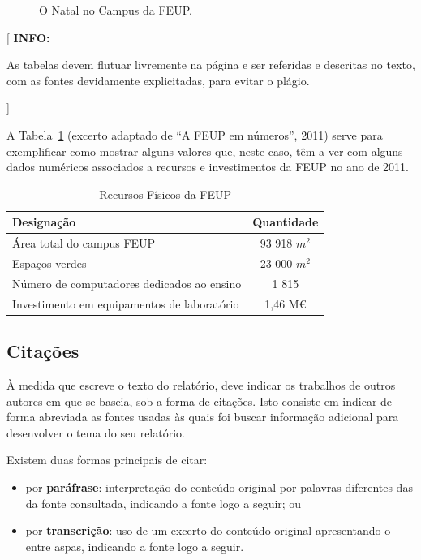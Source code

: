 \documentclass[11pt,a4paper]{report}
\newenvironment{info}[1]{\vspace*{6mm}\color{blue}[ \textbf{INFO:} \begin{em} #1}
                        {\vspace*{3mm}\end{em} ]}
\begin{document}
\lipsum[3]

\begin{figure} [b]
  \centering
  \caption{O Natal no Campus da FEUP.} \label{fig:natal}
\end{figure}

\lipsum[4]

\begin{info}
As tabelas devem flutuar livremente na página e ser referidas e
descritas no texto, com as fontes devidamente explicitadas, para
evitar o plágio.
\end{info}

A Tabela~\ref{tab:feup} (excerto adaptado de ``A FEUP em números'', 2011)
serve para exemplificar como mostrar alguns valores que, neste caso, têm
a ver com alguns dados numéricos associados a recursos e investimentos
da FEUP no ano de 2011. 

\lipsum[4]

\begin{table}
  \centering
  \caption{Recursos Físicos da FEUP}
  \begin{tabular}{| l | c |}
    \hline
    \textbf{Designação} & \textbf{Quantidade}\\\hline
    \hline
    Área total do campus FEUP & 93 918 $m^2$\\\hline
    Espaços verdes & 23 000 $m^2$\\\hline
    Número de computadores dedicados ao ensino & 1 815\\\hline
    Investimento em equipamentos de laboratório & 1,46 M€\\
    \hline
  \end{tabular}
  \label{tab:feup}
\end{table}

\lipsum[6]

\subsection*{Citações}

À medida que escreve o texto do relatório, deve indicar os trabalhos
de outros autores em que se baseia, sob a forma de citações.
Isto consiste em indicar de forma abreviada as fontes usadas às quais
foi buscar informação adicional para desenvolver o tema do seu
relatório.

Existem duas formas principais de citar:
\begin{itemize}
\item por \textbf{paráfrase}: interpretação do conteúdo original por
  palavras diferentes das da fonte consultada, indicando a fonte logo
  a seguir; ou 
\item 
  por \textbf{transcrição}: uso de um excerto do conteúdo original
  apresentando-o entre aspas, indicando a fonte logo a seguir.
\end{itemize}
\end{document}
